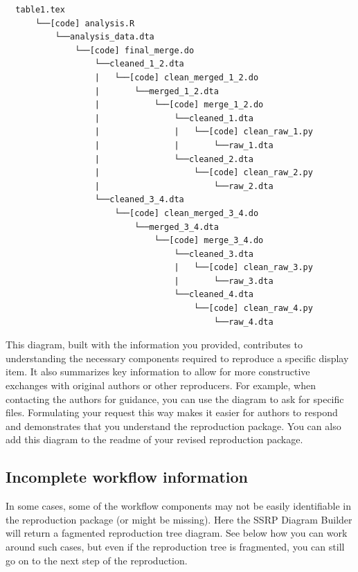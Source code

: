 \documentclass[
]{book}
\begin{document}
\begin{verbatim}
  table1.tex
      └──[code] analysis.R
          └──analysis_data.dta
              └──[code] final_merge.do
                  └──cleaned_1_2.dta
                  |   └──[code] clean_merged_1_2.do
                  |       └──merged_1_2.dta
                  |           └──[code] merge_1_2.do
                  |               └──cleaned_1.dta
                  |               |   └──[code] clean_raw_1.py
                  |               |       └──raw_1.dta
                  |               └──cleaned_2.dta
                  |                   └──[code] clean_raw_2.py
                  |                       └──raw_2.dta
                  └──cleaned_3_4.dta
                      └──[code] clean_merged_3_4.do
                          └──merged_3_4.dta
                              └──[code] merge_3_4.do
                                  └──cleaned_3.dta
                                  |   └──[code] clean_raw_3.py
                                  |       └──raw_3.dta
                                  └──cleaned_4.dta
                                      └──[code] clean_raw_4.py
                                          └──raw_4.dta
\end{verbatim}

This diagram, built with the information you provided, contributes to understanding the necessary components required to reproduce a specific display item. It also summarizes key information to allow for more constructive exchanges with original authors or other reproducers. For example, when contacting the authors for guidance, you can use the diagram to ask for specific files. Formulating your request this way makes it easier for authors to respond and demonstrates that you understand the reproduction package. You can also add this diagram to the readme of your revised reproduction package.

\hypertarget{incomplete-workflow-information}{%
\subsection{Incomplete workflow information}\label{incomplete-workflow-information}}

In some cases, some of the workflow components may not be easily identifiable in the reproduction package (or might be missing). Here the SSRP Diagram Builder will return a fagmented reproduction tree diagram. See below how you can work around such cases, but even if the reproduction tree is fragmented, you can still go on to the next step of the reproduction.
\end{document}
